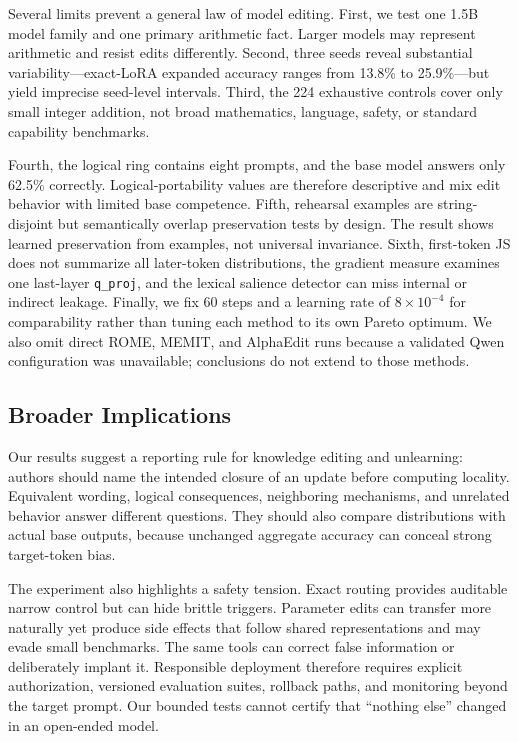 Several limits prevent a general law of model editing. First, we test one 1.5B model family and one primary arithmetic fact. Larger models may represent arithmetic and resist edits differently. Second, three seeds reveal substantial variability---exact-LoRA expanded accuracy ranges from 13.8\% to 25.9\%---but yield imprecise seed-level intervals. Third, the 224 exhaustive controls cover only small integer addition, not broad mathematics, language, safety, or standard capability benchmarks.

Fourth, the logical ring contains eight prompts, and the base model answers only 62.5\% correctly. Logical-portability values are therefore descriptive and mix edit behavior with limited base competence. Fifth, rehearsal examples are string-disjoint but semantically overlap preservation tests by design. The result shows learned preservation from examples, not universal invariance. Sixth, first-token JS does not summarize all later-token distributions, the gradient measure examines one last-layer \texttt{q\_proj}, and the lexical salience detector can miss internal or indirect leakage. Finally, we fix 60 steps and a learning rate of $8\times10^{-4}$ for comparability rather than tuning each method to its own Pareto optimum. We also omit direct ROME, MEMIT, and AlphaEdit runs because a validated Qwen configuration was unavailable; conclusions do not extend to those methods.

\subsection{Broader Implications}

Our results suggest a reporting rule for knowledge editing and unlearning: authors should name the intended closure of an update before computing locality. Equivalent wording, logical consequences, neighboring mechanisms, and unrelated behavior answer different questions. They should also compare distributions with actual base outputs, because unchanged aggregate accuracy can conceal strong target-token bias.

The experiment also highlights a safety tension. Exact routing provides auditable narrow control but can hide brittle triggers. Parameter edits can transfer more naturally yet produce side effects that follow shared representations and may evade small benchmarks. The same tools can correct false information or deliberately implant it. Responsible deployment therefore requires explicit authorization, versioned evaluation suites, rollback paths, and monitoring beyond the target prompt. Our bounded tests cannot certify that ``nothing else'' changed in an open-ended model.

